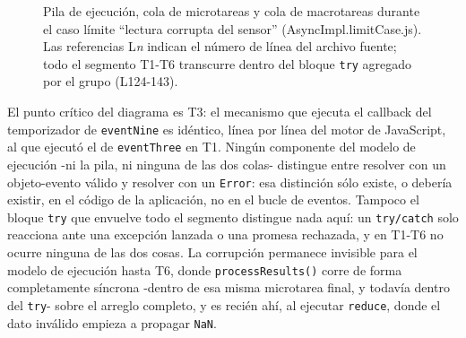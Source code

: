 \documentclass[conference,a4paper]{IEEEtran}
\begin{document}
\begin{figure}[t]
\caption{Pila de ejecuci\'on, cola de microtareas y cola de macrotareas durante el caso l\'imite ``lectura corrupta del sensor'' (AsyncImpl.limitCase.js). Las referencias L\emph{n} indican el n\'umero de l\'inea del archivo fuente; todo el segmento T1-T6 transcurre dentro del bloque \texttt{try} agregado por el grupo (L124-143).}
\label{fig:diagrama}
\end{figure}
\FloatBarrier

El punto cr\'itico del diagrama es T3: el mecanismo que ejecuta el callback del temporizador de \texttt{eventNine} es id\'entico, l\'inea por l\'inea del motor de JavaScript, al que ejecut\'o el de \texttt{eventThree} en T1. Ning\'un componente del modelo de ejecuci\'on -ni la pila, ni ninguna de las dos colas- distingue entre resolver con un objeto-evento v\'alido y resolver con un \texttt{Error}: esa distinci\'on s\'olo existe, o deber\'ia existir, en el c\'odigo de la aplicaci\'on, no en el bucle de eventos. Tampoco el bloque \texttt{try} que envuelve todo el segmento distingue nada aqu\'i: un \texttt{try/catch} solo reacciona ante una excepci\'on lanzada o una promesa rechazada, y en T1-T6 no ocurre ninguna de las dos cosas. La corrupci\'on permanece invisible para el modelo de ejecuci\'on hasta T6, donde \texttt{processResults()} corre de forma completamente s\'incrona -dentro de esa misma microtarea final, y todav\'ia dentro del \texttt{try}- sobre el arreglo completo, y es reci\'en ah\'i, al ejecutar \texttt{reduce}, donde el dato inv\'alido empieza a propagar \texttt{NaN}.
\end{document}
